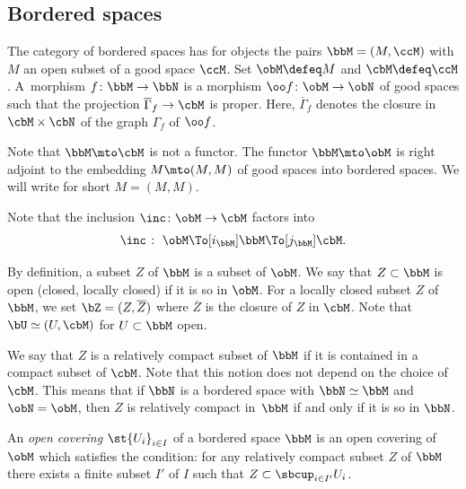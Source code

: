 \subsection{Bordered spaces}
The category of bordered spaces has for objects the pairs $\bbM=(M,\ccM)$ with $M$ an open subset of a good space $\ccM$. Set $\obM\defeq M$ and $\cbM\defeq\ccM$.
A~morphism $f\colon\bbM\to\bbN$ is a morphism $\oo f\colon \obM\to \obN$ of good spaces such that the projection $\overline\Gamma_f \to \cbM$ is proper. Here, $\overline\Gamma_f$ denotes the closure in $\cbM\times\cbN$ of the graph $\Gamma_f$ of $\oo f$.

Note that $\bbM\mto\cbM$ is not a functor.
The functor $\bbM\mto\obM$ is right adjoint to the embedding $M\mto(M,M)$ of good spaces into bordered spaces.
We will write for short $M=(M,M)$.

Note that the inclusion $\inc\colon\obM\to\cbM$ factors into
\begin{equation}
\label{eq:k}
\inc\;\colon\; \obM \To[i_\bbM] \bbM\To[j_\bbM] \cbM.
\end{equation}

By definition, a subset $Z$ of $\bbM$ is a subset of $\obM$.
We say that $Z\subset\bbM$ is open (\resp closed, locally closed) if it is so in $\obM$.
For a locally closed subset $Z$ of $\bbM$,
we set $\bZ=(Z,\overline Z)$ where $\overline Z$ is the closure of $Z$ in $\cbM$.
Note that $\bU\simeq(U,\cbM)$ for $U\subset\bbM$ open.

We say that $Z$ is a relatively compact subset of $\bbM$
if it is contained in a compact subset of $\cbM$.
Note that this notion does not depend on the choice of $\cbM$.
This means that if $\bbN$ is a bordered space with $\bbN\simeq\bbM$ and $\obN=\obM$, then $Z$ is relatively compact in~$\bbM$ if and only if it is so in $\bbN$.

An \emph{open covering} $\st{ U_i}_{i\in I}$ of a bordered space $\bbM$ is
an open covering of $\obM$ which satisfies the condition:
for any relatively compact subset $Z$ of $\bbM$ there exists a finite subset $I'$ of $I$ such that $Z\subset\sbcup_{i\in I'}U_i$.

